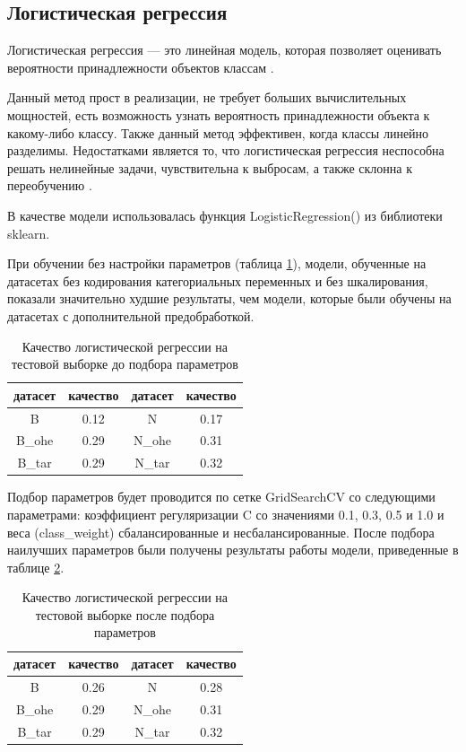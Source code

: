 \documentclass[14pt]{mmcs_article}
\begin{document}
\subsection{Логистическая регрессия}

Логистическая регрессия --- это линейная модель, которая позволяет оценивать вероятности принадлежности объектов классам \cite{lib:logreg}.

Данный метод прост в реализации, не требует больших вычислительных мощностей, есть возможность узнать вероятность принадлежности объекта к какому-либо классу. Также данный метод эффективен, когда классы линейно разделимы. Недостатками является то, что логистическая регрессия неспособна решать нелинейные задачи, чувствительна к выбросам, а также склонна к переобучению \cite{lib:logreg2}.

В качестве модели использовалась функция LogisticRegression() из библиотеки sklearn.

При обучении без настройки параметров (таблица \ref{models:table3}), модели, обученные на датасетах без кодирования категориальных переменных и без шкалирования, показали значительно худшие результаты, чем модели, которые были обучены на датасетах с дополнительной предобработкой.

\begin{table}[H]
	\centering
	\caption{Качество логистической регрессии на тестовой выборке до подбора параметров}\label{models:table3}
	\begin{tabular}{cccc}
		\hline
		датасет & качество	& датасет & качество \\
		\hline
		B &	0.12 &	N &	0.17 \\
		B\_ohe & 0.29 &	N\_ohe & 0.31\\
		B\_tar & 0.29 & N\_tar & 0.32 \\
		\hline
	\end{tabular}
\end{table}

Подбор параметров будет проводится по сетке GridSearchCV со следующими параметрами: коэффициент регуляризации C со значениями 0.1, 0.3, 0.5 и 1.0 и веса (class\_weight) сбалансированные и несбалансированные. После подбора наилучших параметров были получены результаты работы модели, приведенные в таблице \ref{models:table4}.

\begin{table}[H]
	\centering
\caption{Качество логистической регрессии на тестовой выборке после подбора параметров}\label{models:table4}
\begin{tabular}{cccc}
	\hline
	датасет & качество	& датасет & качество \\
	\hline
	B &	0.26 &	N &	0.28 \\
	B\_ohe & 0.29 &	N\_ohe & 0.31\\
	B\_tar & 0.29 & N\_tar & 0.32 \\
	\hline
\end{tabular}
\end{table}
\end{document}
